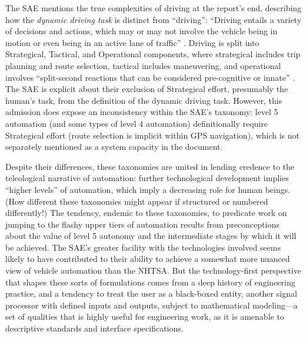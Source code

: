 The SAE mentions the true complexities of driving at the report's end,
describing how the \emph{dynamic driving task} is distinct from ``driving'':
``Driving entails a variety of decisions and actions, which may or may
not involve the vehicle being in motion or even being in an active
lane of traffic'' \cite[p. 12]{SAE}. Driving is split into Strategical, Tactical, and
Operational components, where strategical includes trip planning and
route selection, tactical includes maneuvering, and operational
involves ``split-second reactions that can be considered pre-cognitive
or innate'' \cite{Michon}. The SAE is explicit about their exclusion of Strategical
effort, presumably the human's task, from the definition of the
dynamic driving task. However, this admission does expose an
inconsistency within the SAE's taxonomy: level 5 automation (and some
types of level 4 automation) definitionally require Strategical effort
(route selection is implicit within GPS navigation), which is not
separately mentioned as a system capacity in the document.


Despite their differences, these taxonomies are united in lending
credence to the teleological narrative of automation:  further
technological development implies ``higher levels'' of automation, which
imply a decreasing role for human beings. (How different these
taxonomies might appear if structured or numbered differently!)
The tendency, endemic to these taxonomies, to predicate work on
jumping to the flashy upper tiers of automation results from
preconceptions about the value of level 5 autonomy and the
intermediate stages by which it will be achieved. The SAE's 
greater facility with the technologies involved seems likely to have
contributed to their ability to achieve a somewhat more nuanced view
of vehicle automation than the NHTSA. But the
technology-first perspective that shapes these sorts of formulations
comes from a deep history of engineering practice, and a 
tendency to treat the user as a black-boxed entity, another signal
processor with defined inputs and outputs, subject to mathematical
modeling---a set of qualities that is highly useful for engineering
work, as it is amenable to descriptive standards and interface
specifications. 


